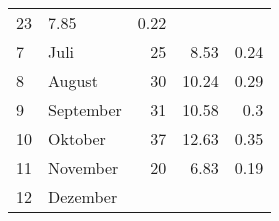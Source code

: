 \begin{longtable}{lXrrr}
       \num{23} &
       \num[round-mode=places,round-precision=2]{7,85} &
         \num[round-mode=places,round-precision=2]{0,22} \\

     7 &
     \multicolumn{1}{X}{ Juli   } &


       \num{25} &
       \num[round-mode=places,round-precision=2]{8,53} &
         \num[round-mode=places,round-precision=2]{0,24} \\

     8 &
     \multicolumn{1}{X}{ August   } &


       \num{30} &
       \num[round-mode=places,round-precision=2]{10,24} &
         \num[round-mode=places,round-precision=2]{0,29} \\

     9 &
     \multicolumn{1}{X}{ September   } &


       \num{31} &
       \num[round-mode=places,round-precision=2]{10,58} &
         \num[round-mode=places,round-precision=2]{0,3} \\

     10 &
     \multicolumn{1}{X}{ Oktober   } &


       \num{37} &
       \num[round-mode=places,round-precision=2]{12,63} &
         \num[round-mode=places,round-precision=2]{0,35} \\

     11 &
     \multicolumn{1}{X}{ November   } &


       \num{20} &
       \num[round-mode=places,round-precision=2]{6,83} &
         \num[round-mode=places,round-precision=2]{0,19} \\

     12 &
     \multicolumn{1}{X}{ Dezember   } &



\end{longtable}
